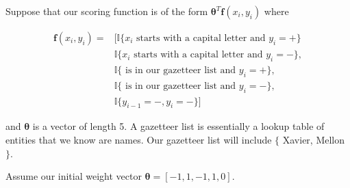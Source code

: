 \documentclass[11pt,addpoints,answers]{exam}
\numberwithin{equation}{section} %
\numberwithin{figure}{section} %
\numberwithin{table}{section} %
\newcommand{\fv}{\mathbf{f}}
\newcommand{\thetav     }{\boldsymbol \theta     }
\newcommand \ind [1]{\mathbb{I}\{#1\}}
\begin{document}
\begin{questions}

\question Suppose that our scoring function is of the form $\thetav^T \fv(x_i, y_i)$ where 

\begin{equation*}
\begin{split}
\fv(x_i, y_i) = & [\ind{x_i \text{ starts with a capital letter and } y_i =  +} \\
& \ind{x_i \text{ starts with a capital letter and } y_i =  -}, \\
& \ind{\text{ is in our gazetteer list and } y_i = +}, \\
& \ind{\text{ is in our gazetteer list and } y_i = -}, \\
& \ind{y_{i-1} = -, y_i = -}]
\end{split}
\end{equation*}

and $\thetav$ is a vector of length 5. A gazetteer list is essentially a lookup table of entities that we know are names. Our gazetteer list will include $\{$ Xavier, Mellon $\}$. 

Assume our initial weight vector $\thetav = [-1, 1, -1, 1, 0]$. 

\end{questions}
\end{document}
